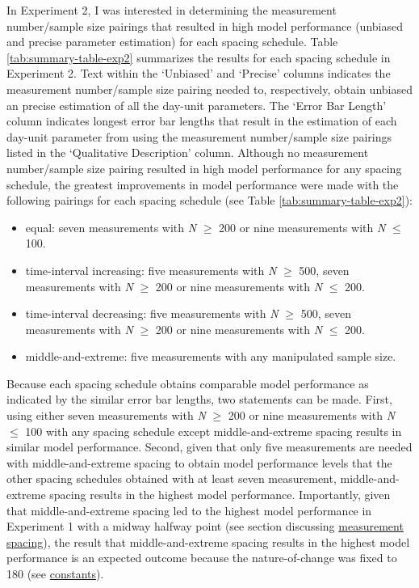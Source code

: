 \documentclass[
12pt, %
twoside,
english]{guelphthesis}
\begin{document}
In Experiment 2, I was interested in determining the measurement number/sample size pairings that resulted in high model performance (unbiased and precise parameter estimation) for each spacing schedule. Table \ref{tab:summary-table-exp2} summarizes the results for each spacing schedule in Experiment 2. Text within the `Unbiased' and `Precise' columns indicates the measurement number/sample size pairing needed to, respectively, obtain unbiased an precise estimation of all the day-unit parameters. The `Error Bar Length' column indicates longest error bar lengths that result in the estimation of each day-unit parameter from using the measurement number/sample size pairings listed in the `Qualitative Description' column. Although no measurement number/sample size pairing resulted in high model performance for any spacing schedule, the greatest improvements in model performance were made with the following pairings for each spacing schedule (see Table \ref{tab:summary-table-exp2}):
\begin{itemize}
\tightlist
\item
  equal: seven measurements with \emph{N} \(\ge\) 200 or nine measurements with \emph{N} \(\le\) 100.
\item
  time-interval increasing: five measurements with \emph{N} \(\ge\) 500, seven measurements with \emph{N} \(\ge\) 200 or nine measurements with \emph{N} \(\le\) 200.
\item
  time-interval decreasing: five measurements with \emph{N} \(\ge\) 500, seven measurements with \emph{N} \(\ge\) 200 or nine measurements with \emph{N} \(\le\) 200.
\item
  middle-and-extreme: five measurements with any manipulated sample size.
\end{itemize}
\noindent Because each spacing schedule obtains comparable model performance as indicated by the similar error bar lengths, two statements can be made. First, using either seven measurements with \emph{N} \(\ge\) 200 or nine measurements with \emph{N} \(\le\) 100 with any spacing schedule except middle-and-extreme spacing results in similar model performance. Second, given that only five measurements are needed with middle-and-extreme spacing to obtain model performance levels that the other spacing schedules obtained with at least seven measurement, middle-and-extreme spacing results in the highest model performance. Importantly, given that middle-and-extreme spacing led to the highest model performance in Experiment 1 with a midway halfway point (see section discussing \protect\hyperlink{meas-placing}{measurement spacing}), the result that middle-and-extreme spacing results in the highest model performance is an expected outcome because the nature-of-change was fixed to 180 (see \protect\hyperlink{constants-exp2}{constants}).
\end{document}
